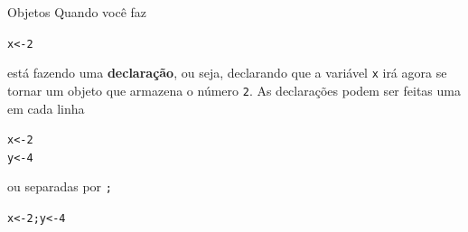 \documentclass[10pt,handout]{beamer}\usepackage[]{graphicx}\usepackage[]{color}
\makeatletter
\newcommand{\hlnum}[1]{\textcolor[rgb]{0.686,0.059,0.569}{#1}}%
\newcommand{\hlstd}[1]{\textcolor[rgb]{0.345,0.345,0.345}{#1}}%
\newcommand{\hlkwb}[1]{\textcolor[rgb]{0.69,0.353,0.396}{#1}}%
\newenvironment{kframe}{%
 \def\at@end@of@kframe{}%
 \ifinner\ifhmode%
  \def\at@end@of@kframe{\end{minipage}}%
  \begin{minipage}{\columnwidth}%
 \fi\fi%
 \def\FrameCommand##1{\hskip\@totalleftmargin \hskip-\fboxsep
 \colorbox{shadecolor}{##1}\hskip-\fboxsep
     \hskip-\linewidth \hskip-\@totalleftmargin \hskip\columnwidth}%
 \MakeFramed {\advance\hsize-\width
   \@totalleftmargin\z@ \linewidth\hsize
   \@setminipage}}%
 {\par\unskip\endMakeFramed%
 \at@end@of@kframe}
\newenvironment{knitrout}{}{} %
\makeatother
\begin{document}
\begin{frame}[fragile]{Objetos}
Quando você faz
\begin{knitrout}\small
{}\color{fgcolor}\begin{kframe}
\begin{alltt}
\hlstd{x} \hlkwb{<-} \hlnum{2}
\end{alltt}
\end{kframe}
\end{knitrout}
está fazendo uma \textbf{declaração}, ou seja, declarando que a variável
\verb|x| irá agora se tornar um objeto que armazena o número
\verb|2|. As declarações podem ser feitas uma em cada linha
\begin{knitrout}\small
{}\color{fgcolor}\begin{kframe}
\begin{alltt}
\hlstd{x} \hlkwb{<-} \hlnum{2}
\hlstd{y} \hlkwb{<-} \hlnum{4}
\end{alltt}
\end{kframe}
\end{knitrout}
ou separadas por \verb|;|
\begin{knitrout}\small
{}\color{fgcolor}\begin{kframe}
\begin{alltt}
\hlstd{x} \hlkwb{<-} \hlnum{2}\hlstd{; y} \hlkwb{<-} \hlnum{4}
\end{alltt}
\end{kframe}
\end{knitrout}
\end{frame}
\end{document}
